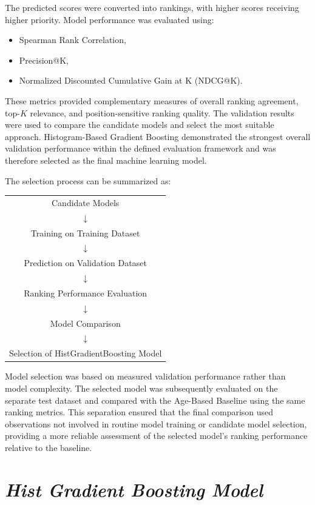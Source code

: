 \documentclass[12pt,a4paper]{report}
\begin{document}
The predicted scores were converted into rankings, with higher scores receiving higher priority. Model performance was evaluated using:

\begin{itemize}
    \item Spearman Rank Correlation,
    \item Precision@K,
    \item Normalized Discounted Cumulative Gain at K (NDCG@K).
\end{itemize}

These metrics provided complementary measures of overall ranking agreement, top-$K$ relevance, and position-sensitive ranking quality. The validation results were used to compare the candidate models and select the most suitable approach. Histogram-Based Gradient Boosting demonstrated the strongest overall validation performance within the defined evaluation framework and was therefore selected as the final machine learning model.

The selection process can be summarized as:

\begin{center}
\begin{tabular}{c}
Candidate Models \\
$\downarrow$ \\
Training on Training Dataset \\
$\downarrow$ \\
Prediction on Validation Dataset \\
$\downarrow$ \\
Ranking Performance Evaluation \\
$\downarrow$ \\
Model Comparison \\
$\downarrow$ \\
Selection of HistGradientBoosting Model
\end{tabular}
\end{center}

Model selection was based on measured validation performance rather than model complexity. The selected model was subsequently evaluated on the separate test dataset and compared with the Age-Based Baseline using the same ranking metrics. This separation ensured that the final comparison used observations not involved in routine model training or candidate model selection, providing a more reliable assessment of the selected model's ranking performance relative to the baseline.


\section{\textit{Hist Gradient Boosting Model}}
\end{document}
